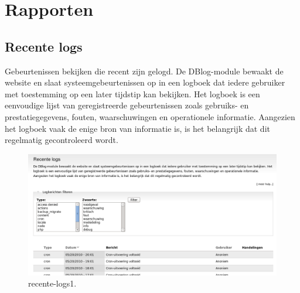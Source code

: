 \chapter{Rapporten}

\section{Recente logs} 
    Gebeurtenissen bekijken die recent zijn gelogd.
De DBlog-module  bewaakt de website en slaat
systeemgebeurtenissen op in een logboek dat iedere gebruiker met toestemming op een later tijdstip kan bekijken. 
Het logboek  is een eenvoudige lijst van geregistreerde
gebeurtenissen zoals gebruiks- en prestatiegegevens, fouten, waarschuwingen en operationele informatie. 
Aangezien het logboek vaak de enige bron van informatie is, is het belangrijk dat dit 
regelmatig gecontroleerd wordt.
 \begin{figure}[!h]
    \centering
   \includegraphics[scale=0.4,angle=0]{recente-logs1}
   \caption{recente-logs1.\label{white}}
 \end{figure}
    
